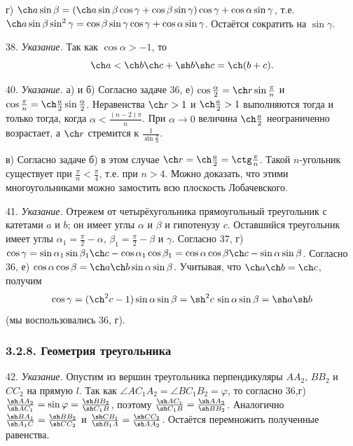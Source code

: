 	г) $\ch a \sin\beta = (\ch a \sin\beta\cos\gamma + \cos\beta\sin\gamma)\cos\gamma + \cos\alpha\sin\gamma$, т.е.
	$\ch a \sin\beta\sin^2\gamma = \cos\beta\sin\gamma\cos\gamma + \cos\alpha\sin\gamma$. Остаётся сократить на $\sin\gamma$.

	38. \textit{Указание.} Так как $\cos\alpha > -1$, то
	\[
		\ch a < \ch b \ch c + \sh b \sh c = \ch(b + c).
	\]

	40. \textit{Указание.} а) и б) Согласно задаче 36, е) $\cos\frac{\alpha}{2} = \ch r \sin\frac{\pi}{n}$ и
	$\cos\frac{\pi}{n} = \ch\frac{a}{2}\sin\frac{\alpha}{2}$. Неравенства $\ch r > 1$ и $\ch\frac{a}{2} > 1$ выполняются тогда и только тогда, когда $\alpha < \frac{(n-2)\pi}{n}$. При $\alpha \to 0$ величина $\ch\frac{a}{2}$ неограниченно возрастает, а $\ch r$ стремится к $\frac{1}{\sin\frac{\pi}{n}}$.

	в) Согласно задаче б) в этом случае $\ch r = \ch\frac{a}{2} = \ctg\frac{\pi}{n}$. Такой $n$-угольник существует при $\frac{\pi}{n} < \frac{\pi}{4}$, т.е. при $n > 4$. Можно доказать, что этими многоугольниками можно замостить всю плоскость Лобачевского.

	41. \textit{Указание.} Отрежем от четырёхугольника прямоугольный треугольник с катетами $a$ и $b$; он имеет углы $\alpha$ и $\beta$ и гипотенузу $c$. Оставшийся треугольник имеет углы $\alpha_1 = \frac{\pi}{2} - \alpha$, $\beta_1 = \frac{\pi}{2} - \beta$ и $\gamma$. Согласно 37, г)
	$\cos\gamma = \sin\alpha_1\sin\beta_1\ch c - \cos\alpha_1\cos\beta_1 = \cos\alpha\cos\beta\ch c - \sin\alpha\sin\beta$.
	Согласно 36, е) $\cos\alpha\cos\beta = \ch a \ch b \sin\alpha\sin\beta$. Учитывая, что $\ch a \ch b = \ch c$, получим
	\[
		\cos\gamma = (\ch^2 c - 1)\sin\alpha\sin\beta = \sh^2 c\,\sin\alpha\sin\beta = \sh a\sh b
	\]
	(мы воспользовались 36, г).

	\subsubsection{3.2.8. Геометрия треугольника}
 
	42. \textit{Указание.} Опустим из вершин треугольника перпендикуляры $AA_2$, $BB_2$ и $CC_2$ на прямую $l$. Так как $\angle AC_1A_2 = \angle BC_1B_2 = \varphi$, то согласно 36,г) $\frac{\sh AA_2}{\sh AC_1} = \sin\varphi = \frac{\sh BB_2}{\sh C_1B}$, поэтому $\frac{\sh AC_1}{\sh C_1B} = \frac{\sh AA_2}{\sh BB_2}$. Аналогично $\frac{\sh BA_1}{\sh A_1C} = \frac{\sh BB_2}{\sh CC_2}$ и $\frac{\sh CB_1}{\sh B_1A} = \frac{\sh CC_2}{\sh AA_2}$. Остаётся перемножить полученные равенства.

